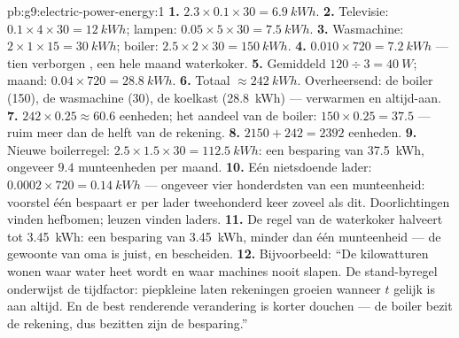 \begin{solution}{pb:g9:electric-power-energy:1}
\textbf{1.} $2.3 \times 0.1 \times 30 = \qty{6.9}{kWh}$.
\textbf{2.} Televisie: $0.1 \times 4 \times 30 = \qty{12}{kWh}$;
lampen: $0.05 \times 5 \times 30 = \qty{7.5}{kWh}$.
\textbf{3.} Wasmachine: $2 \times 1 \times 15 = \qty{30}{kWh}$;
boiler: $2.5 \times 2 \times 30 = \qty{150}{kWh}$.
\textbf{4.} $0.010 \times 720 = \qty{7.2}{kWh}$ --- tien verborgen
, een hele maand waterkoker.
\textbf{5.} Gemiddeld $120 \div 3 = \qty{40}{W}$; maand: $0.04 \times
720 = \qty{28.8}{kWh}$.
\textbf{6.} Totaal $\approx \qty{242}{kWh}$. Overheersend: de boiler
(\qty{150}{}), de wasmachine (\qty{30}{}), de koelkast
(\qty{28.8}{kWh}) --- verwarmen en altijd-aan.
\textbf{7.} $242 \times 0.25 \approx 60.6$ eenheden; het aandeel
van de boiler: $150 \times 0.25 = 37.5$ --- ruim meer dan de helft van
de rekening.
\textbf{8.} $2150 + 242 = 2392$ eenheden.
\textbf{9.} Nieuwe boilerregel: $2.5 \times 1.5 \times 30 =
\qty{112.5}{kWh}$: een besparing van \qty{37.5}{kWh}, ongeveer $9.4$
munteenheden per maand.
\textbf{10.} Eén nietsdoende lader: $0.0002 \times 720 =
\qty{0.14}{kWh}$ --- ongeveer vier honderdsten van een
munteenheid: voorstel één bespaart er per lader tweehonderd keer
zoveel als dit. Doorlichtingen vinden hefbomen; leuzen vinden
laders.
\textbf{11.} De regel van de waterkoker halveert tot \qty{3.45}{kWh}:
een besparing van \qty{3.45}{kWh}, minder dan één
munteenheid --- de gewoonte van oma is juist, en bescheiden.
\textbf{12.} Bijvoorbeeld: ``De kilowatturen wonen waar water
heet wordt en waar machines nooit slapen. De stand-byregel onderwijst
de tijdfactor: piepkleine  laten rekeningen groeien
wanneer $t$ gelijk is aan altijd. En de best renderende verandering is
korter douchen --- de boiler bezit de rekening, dus bezitten zijn
 de besparing.''
\end{solution}
